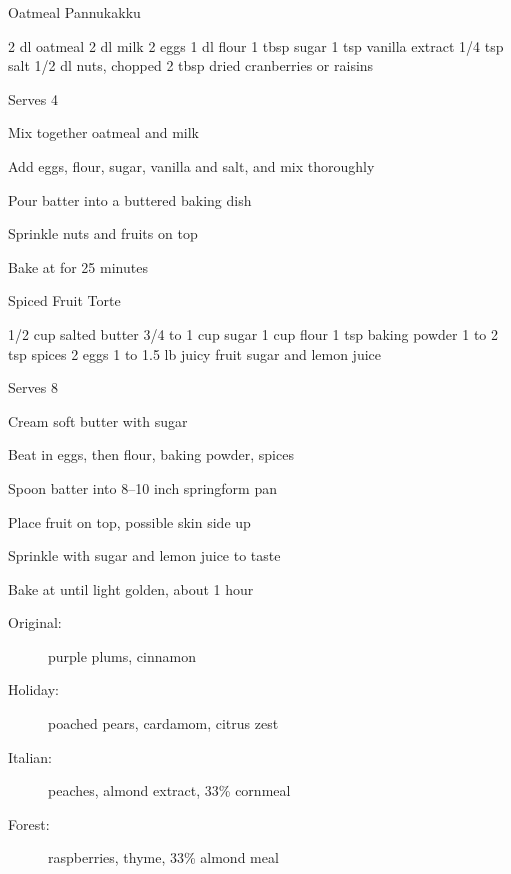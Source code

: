 \begin{recipe}{Oatmeal Pannukakku}{}
\begin{ingredients}
2 dl oatmeal
2 dl milk
2 eggs
1 dl flour
1 tbsp sugar
1 tsp vanilla extract
1/4 tsp salt
1/2 dl nuts, chopped
2 tbsp dried cranberries or raisins
\end{ingredients}
\nextcolumn
Serves 4
\begin{steps}
    \item Mix together oatmeal and milk
    \item Add eggs, flour, sugar, vanilla and salt, and mix thoroughly
    \item Pour batter into a buttered baking dish
    \item Sprinkle nuts and fruits on top
    \item Bake at  for 25 minutes
\end{steps}
\end{recipe}

\begin{denserecipe}{Spiced Fruit Torte}{}
\begin{ingredients}
1/2 cup salted butter
3/4 to 1 cup sugar
1 cup flour
1 tsp baking powder
1 to 2 tsp spices
2 eggs
1 to 1.5 lb juicy fruit
sugar and lemon juice
\end{ingredients}
\nextcolumn
Serves 8
\begin{steps}
    \item Cream soft butter with sugar
    \item Beat in eggs, then flour, baking powder, spices
    \item Spoon batter into 8--10 inch springform pan
    \item Place fruit on top, possible skin side up
    \item Sprinkle with sugar and lemon juice to taste
    \item Bake at  until light golden, about 1 hour
\end{steps}
\begin{description}
    \item[Original:] purple plums, cinnamon
    \item[Holiday:] poached pears, cardamom, citrus zest
    \item[Italian:] peaches, almond extract, 33\% cornmeal
    \item[Forest:] raspberries, thyme, 33\% almond meal
\end{description}
\end{denserecipe}

